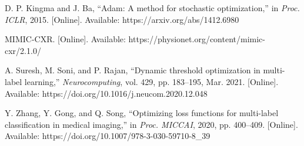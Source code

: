 \documentclass[12pt]{article}
\begin{document}
\begin{thebibliography}{99}
D. P. Kingma and J. Ba, “Adam: A method for stochastic optimization,” in \textit{Proc. ICLR}, 2015. [Online]. Available: https://arxiv.org/abs/1412.6980

MIMIC-CXR. [Online]. Available: https://physionet.org/content/mimic-cxr/2.1.0/

A. Suresh, M. Soni, and P. Rajan, “Dynamic threshold optimization in multi-label learning,” \textit{Neurocomputing}, vol. 429, pp. 183–195, Mar. 2021. [Online]. Available: https://doi.org/10.1016/j.neucom.2020.12.048

Y. Zhang, Y. Gong, and Q. Song, “Optimizing loss functions for multi-label classification in medical imaging,” in \textit{Proc. MICCAI}, 2020, pp. 400–409. [Online]. Available: https://doi.org/10.1007/978-3-030-59710-8_39

\end{thebibliography}
\end{document}

